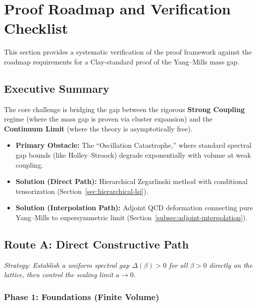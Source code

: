 \section{Proof Roadmap and Verification Checklist}
\label{sec:roadmap-verification}
\label{thm:verification-checklist}

This section provides a systematic verification of the proof framework against 
the roadmap requirements for a Clay-standard proof of the Yang--Mills mass gap.

\subsection{Executive Summary}

The core challenge is bridging the gap between the rigorous \textbf{Strong Coupling} 
regime (where the mass gap is proven via cluster expansion) and the \textbf{Continuum 
Limit} (where the theory is asymptotically free).

\begin{itemize}
\item \textbf{Primary Obstacle:} The ``Oscillation Catastrophe,'' where standard 
spectral gap bounds (like Holley--Stroock) degrade exponentially with volume at weak coupling.
\item \textbf{Solution (Direct Path):} Hierarchical Zegarlinski method with conditional 
tensorization (Section~\ref{sec:hierarchical-lsi}).
\item \textbf{Solution (Interpolation Path):} Adjoint QCD deformation connecting pure 
Yang--Mills to supersymmetric limit (Section~\ref{subsec:adjoint-interpolation}).
\end{itemize}

\subsection{Route A: Direct Constructive Path}

\textit{Strategy: Establish a uniform spectral gap $\Delta(\beta) > 0$ for all 
$\beta > 0$ directly on the lattice, then control the scaling limit $a \to 0$.}

\subsubsection{Phase 1: Foundations (Finite Volume)}

